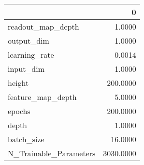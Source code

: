 \begin{tabular}{lr}
\toprule
{} &          0 \\
\midrule
readout\_map\_depth      &     1.0000 \\
output\_dim             &     1.0000 \\
learning\_rate          &     0.0014 \\
input\_dim              &     1.0000 \\
height                 &   200.0000 \\
feature\_map\_depth      &     5.0000 \\
epochs                 &   200.0000 \\
depth                  &     1.0000 \\
batch\_size             &    16.0000 \\
N\_Trainable\_Parameters &  3030.0000 \\
\bottomrule
\end{tabular}
